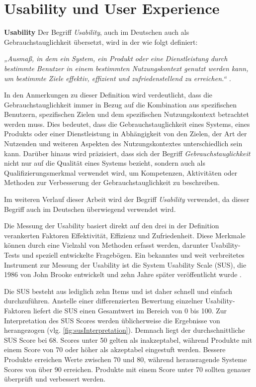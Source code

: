 \section{Usability und User Experience}

\textbf{Usability}
Der Begriff \textit{Usability}, auch im Deutschen auch als Gebrauchstauglichkeit übersetzt, wird in der \citet{DINISO9241-11} wie folgt definiert:

\textit{„Ausmaß, in dem ein System, ein Produkt oder eine Dienstleistung durch bestimmte Benutzer in einem bestimmten Nutzungskontext genutzt werden kann, um bestimmte Ziele effektiv, effizient und zufriedenstellend zu erreichen.“ \cite{DINISO9241-11}.}

In den Anmerkungen zu dieser Definition wird verdeutlicht, dass die Gebrauchstauglichkeit immer in Bezug auf die Kombination aus spezifischen Benutzern, spezifischen Zielen und dem spezifischen Nutzungskontext betrachtet werden muss. Dies bedeutet, dass die Gebrauchstauglichkeit eines Systems, eines Produkts oder einer Dienstleistung in Abhängigkeit von den Zielen, der Art der Nutzenden und weiteren Aspekten des Nutzungskontextes unterschiedlich sein kann. Darüber hinaus wird präzisiert, dass sich der Begriff \textit{Gebrauchstauglichkeit} nicht nur auf die Qualität eines Systems bezieht, sondern auch als Qualifizierungsmerkmal verwendet wird, um Kompetenzen, Aktivitäten oder Methoden zur Verbesserung der Gebrauchstauglichkeit zu beschreiben. 

Im weiteren Verlauf dieser Arbeit wird der Begriff \textit{Usability} verwendet, da dieser Begriff auch im Deutschen überwiegend verwendet wird. 

Die Messung der Usability basiert direkt auf den drei in der Definition verankerten Faktoren Effektivität, Effizienz und Zufriedenheit. Diese Merkmale können durch eine Vielzahl von Methoden erfasst werden, darunter Usability-Tests und speziell entwickelte Fragebögen. Ein bekanntes und weit verbreitetes Instrument zur Messung der Usability ist die System Usability Scale (SUS), die 1986 von John Brooke entwickelt und zehn Jahre später veröffentlicht wurde \citep{brooke_sus_1996}.

Die SUS besteht aus lediglich zehn Items und ist daher schnell und einfach durchzuführen. Anstelle einer differenzierten Bewertung einzelner Usability-Faktoren liefert die SUS einen Gesamtwert im Bereich von 0 bis 100. Zur Interpretation des SUS Scores werden üblicherweise die Ergebnisse von \citet{bangor_empirical_2008} herangezogen (vlg. \autoref{fig:susInterpretation}). Demnach liegt der durchschnittliche SUS Score bei 68. Scores unter 50 gelten als inakzeptabel, während Produkte mit einem Score von 70 oder höher als akzeptabel eingestuft werden. Bessere Produkte erreichen Werte zwischen 70 und 80, während herausragende Systeme Scores von über 90 erreichen. Produkte mit einem Score unter 70 sollten genauer überprüft und verbessert werden. 


